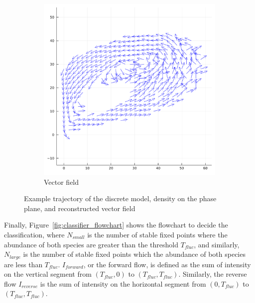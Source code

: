 \begin{figure}
    \begin{subfigure}{0.45\textwidth}
        \centering
        \includegraphics[width=\textwidth]{Figs/2_5_algo_example_vf.pdf}
        \caption{Vector field}
    \end{subfigure}
    \caption[Example trajectory of the discrete model, density on the phase plane,
    and reconstructed vector field]
    {Example trajectory of the discrete model, density on the phase plane,
    and reconstructed vector field}
    \label{fig:density_and_vf}
\end{figure}

Finally, Figure~\ref{fig:classifier_flowchart} shows the flowchart
to decide the classification, where
$N_{small}$ is the number of stable fixed points where the abundance
of both species are greater than the threshold $T_{fluc}$,
and similarly, $N_{large}$ is the number of stable fixed points
which the abundance of both species are less than $T_{fluc}$.
$I_{forward}$, or the forward flow, is defined as the sum of 
intensity on the vertical segment from $(T_{fluc}, 0)$ to 
$(T_{fluc}, T_{fluc})$.
Similarly, the reverse flow $I_{reverse}$ is the sum of intensity
on the horizontal segment from $(0, T_{fluc})$ to $(T_{fluc}, T_{fluc})$.



